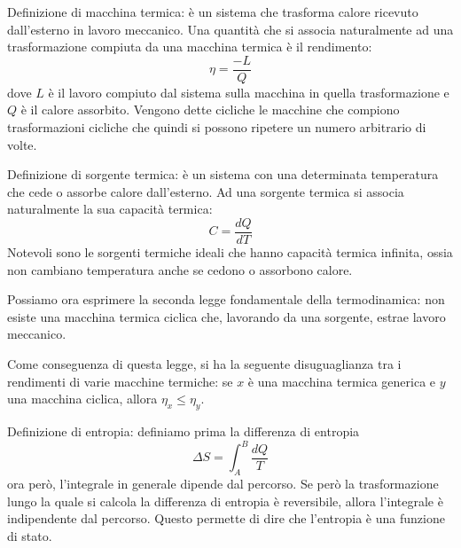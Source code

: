 \documentclass[../main.tex]{subfiles}
\begin{document}
Definizione di macchina termica: è un sistema che trasforma calore ricevuto dall'esterno in lavoro meccanico.
Una quantità che si associa naturalmente ad una trasformazione compiuta da una macchina termica è il rendimento:
\begin{equation}
	\label{term:rendimento}
	\eta = \frac{-L}{Q}
\end{equation}
dove $L$ è il lavoro compiuto dal sistema sulla macchina in quella trasformazione e $Q$ è il calore assorbito.
Vengono dette cicliche le macchine che compiono trasformazioni cicliche che quindi si possono ripetere un numero arbitrario di volte.

Definizione di sorgente termica: è un sistema con una determinata temperatura che cede o assorbe calore dall'esterno. Ad una sorgente termica
si associa naturalmente la sua capacità termica:
\begin{equation}
	\label{term:capacita}
	C = \frac{dQ}{dT}
\end{equation}
Notevoli sono le sorgenti termiche ideali che hanno capacità termica infinita, ossia non cambiano temperatura anche se cedono o assorbono calore.

Possiamo ora esprimere la seconda legge fondamentale della termodinamica: non esiste una macchina termica ciclica che, lavorando da una sorgente,
estrae lavoro meccanico.

Come conseguenza di questa legge, si ha la seguente disuguaglianza tra i rendimenti di varie macchine termiche: se $x$ è una macchina termica generica
e $y$ una macchina ciclica, allora $\eta_x \leq \eta_y$.

Definizione di entropia: definiamo prima la differenza di entropia
\begin{equation}
	\label{term:entropia}
	\Delta S = \int_A^B \frac{dQ}{T}
\end{equation}
ora però, l'integrale in generale dipende dal percorso. Se però la trasformazione lungo la quale si calcola la differenza di entropia è reversibile,
allora l'integrale è indipendente dal percorso. Questo permette di dire che l'entropia è una funzione di stato.
\end{document}
